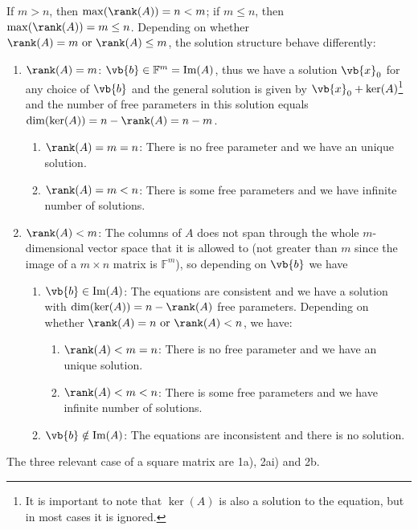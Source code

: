 \documentclass[a4paper,12pt]{report}
\begin{document}
If \(m > n\), then \(\max (\rank (A)) = n < m\); if \(m \le n\), then \(\max (\rank (A)) = m \le n\). Depending on whether \(\rank (A) = m \text { or } \rank (A) \le m\), the solution structure behave differently:  

\begin{enumerate}
    \item \(\rank (A) = m\): \(\vb{b} \in \mathbb{F}^{m} = \text{Im} (A)\), thus we have a solution \(\vb{x} _{0} \) for any choice of \(\vb{b} \) and the general solution is given by \(\vb{x} _{0} + \ker (A) \)\footnote{It is important to note that \(\ker (A)\) is also a solution to the equation, but in most cases it is ignored.} and the number of free parameters in this solution equals \(\dim (\ker (A)) = n - \rank (A) = n-m\).   
    \begin{enumerate}
        \item \(\rank (A) = m = n\): There is no free parameter and we have an unique solution.
        \item \(\rank (A) = m < n\): There is some free parameters and we have infinite number of solutions.  
    \end{enumerate}  
    \item \(\rank (A) < m\): The columns of \(A\) does not span through the whole \(m\)-dimensional vector space that it is allowed to (not greater than \(m\) since the image of a \(m \times n\) matrix is \(\mathbb{F}^{m} \)), so depending on \(\vb{b} \) we have \begin{enumerate}
        \item \(\vb{b} \in  \text{Im}(A) \): The equations are consistent and we have a solution with \(\dim (\ker (A)) = n - \rank (A)\) free parameters. Depending on whether \(\rank (A) = n \text { or } \rank (A) < n\), we have: 
        \begin{enumerate}
            \item \(\rank (A) < m = n\): There is no free parameter and we have an unique solution.
            \item \(\rank (A) < m < n\): There is some free parameters and we have infinite number of solutions.  
        \end{enumerate}
        \item \(\vb{b} \notin \text{Im}(A) \): The equations are inconsistent and there is no solution.  
    \end{enumerate}  
\end{enumerate}

The three relevant case of a square matrix are 1a), 2ai) and 2b.
\end{document}
